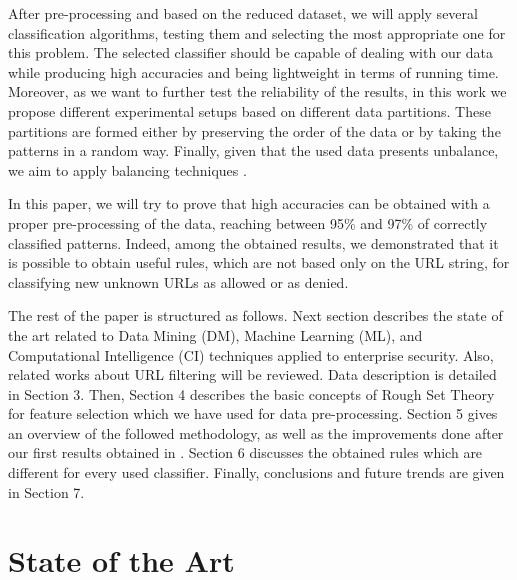 \documentclass{llncs}
\begin{document}
After pre-processing and based on the reduced dataset, we will apply
several classification algorithms, testing them and selecting the most
appropriate one for this problem. The selected classifier should be
capable of dealing with our data while producing high accuracies and
being lightweight in terms of running time. Moreover, as we want to
further test the reliability of the results, in this work we propose
different experimental setups based on different data
partitions. These partitions are formed either by preserving the order
of the data or by taking the patterns in a random way. Finally, given
that the used data presents unbalance, we aim to apply balancing
techniques \cite{imbalance_techniques_02}. 


In this paper, we will try to prove that high accuracies can be obtained with
a proper pre-processing of the data, reaching between 95\% and 97\% of
correctly classified patterns. Indeed, among the obtained results, we
demonstrated that it is possible to obtain useful rules, which are not
based only on the URL string, for classifying new unknown URLs as
allowed or as denied. 


The rest of the paper is structured as follows. Next section describes
the state of the art related to Data Mining (DM), Machine Learning
(ML), and Computational Intelligence (CI) techniques applied to
enterprise security. %
 Also, related works about URL filtering will be reviewed. Data
 description is detailed in Section 3. Then, Section 4 describes the
 basic concepts of Rough Set Theory for feature selection which we
 have used for data pre-processing. Section 5 gives an overview of the
 followed methodology, as well as the improvements done after our
 first results obtained in \cite{ECTA}. Section 6 discusses the
 obtained rules which are different for every used
 classifier. Finally, conclusions and future trends are given in
 Section 7.  

%
\section{State of the Art}
\label{sec:stateofart}
\end{document}
